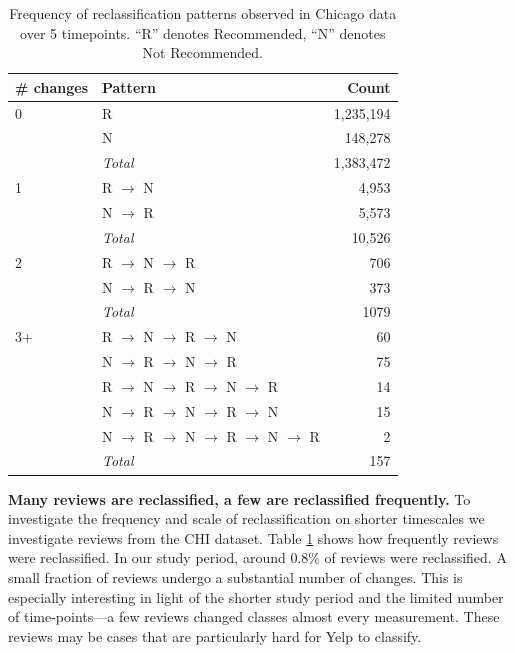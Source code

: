 \begin{table}[t]
    \centering
    \caption{Frequency of reclassification patterns observed in Chicago data over 5 timepoints. ``R'' denotes Recommended, ``N'' denotes Not Recommended.}
    \label{tab:reclassification_patterns}
    \begin{tabular}{llr}
    \# changes & Pattern & Count \\
	 \hline
	 0 & R & 1,235,194\\
	 & N & 148,278\\
	 & \textit{Total} & 1,383,472 \\
	 \hline
	 1& R $\to$ N & 4,953\\
	 & N $\to$ R & 5,573\\
	 & \textit{Total} & 10,526\\
	 \hline
	 2& R $\to$ N $\to$ R & 706\\
	 & N $\to$ R $\to$ N & 373\\
	 & \textit{Total} & 1079\\
	 \hline
	 3+ & R $\to$ N $\to$ R $\to$ N & 60\\
	 & N $\to$ R $\to$ N $\to$ R & 75\\
	 & R $\to$ N $\to$ R $\to$ N $\to$ R & 14\\
	 & N $\to$ R $\to$ N $\to$ R $\to$ N & 15\\
	 & N $\to$ R $\to$ N $\to$ R $\to$ N $\to$ R & 2\\
	 & \textit{Total} & 157\\
	 \hline
    \end{tabular}
\end{table}

\textbf{Many reviews are reclassified, a few are reclassified frequently.} To investigate the frequency and scale of reclassification on shorter timescales we investigate reviews from the CHI dataset. Table \ref{tab:reclassification_patterns} shows how frequently reviews were reclassified. In our study period, around 0.8\% of reviews were reclassified. A small fraction of reviews undergo a substantial number of changes. This is especially interesting in light of the shorter study period and the limited number of time-points---a few reviews changed classes almost every measurement. These reviews may be cases that are particularly hard for Yelp to classify. 


